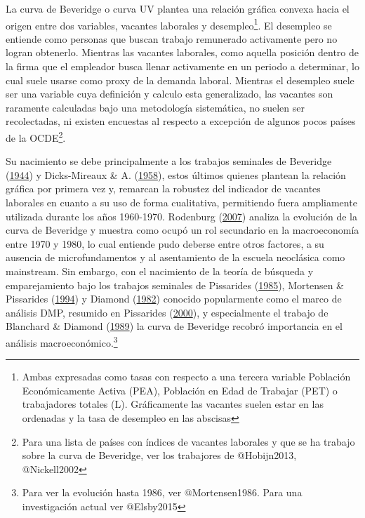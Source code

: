 \documentclass[12pt,twoside]{reedthesis}
\begin{document}
La curva de Beveridge o curva UV plantea una relación gráfica convexa hacia el origen entre dos variables, vacantes laborales y desempleo\footnote{Ambas expresadas como tasas con respecto a una tercera variable Población Económicamente Activa (PEA), Población en Edad de Trabajar (PET) o trabajadores totales (L). Gráficamente las vacantes suelen estar en las ordenadas y la tasa de desempleo en las abscisas}. El desempleo se entiende como personas que buscan trabajo remunerado activamente pero no logran obtenerlo. Mientras las vacantes laborales, como aquella posición dentro de la firma que el empleador busca llenar activamente en un periodo a determinar, lo cual suele usarse como proxy de la demanda laboral.
Mientras el desempleo suele ser una variable cuya definición y calculo esta generalizado, las vacantes son raramente calculadas bajo una metodología sistemática, no suelen ser recolectadas, ni existen encuestas al respecto a excepción de algunos pocos países de la OCDE\footnote{Para una lista de países con índices de vacantes laborales y que se ha trabajo sobre la curva de Beveridge, ver los trabajores de @Hobijn2013, @Nickell2002}.

Su nacimiento se debe principalmente a los trabajos seminales de Beveridge (\protect\hyperlink{ref-Beveridge}{1944}) y Dicks-Mireaux \& A. (\protect\hyperlink{ref-Dicks-Mireaux1958}{1958}), estos últimos quienes plantean la relación gráfica por primera vez y, remarcan la robustez del indicador de vacantes laborales en cuanto a su uso de forma cualitativa, permitiendo fuera ampliamente utilizada durante los años 1960-1970. Rodenburg (\protect\hyperlink{ref-Rodenburg2007}{2007}) analiza la evolución de la curva de Beveridge y muestra como ocupó un rol secundario en la macroeconomía entre 1970 y 1980, lo cual entiende pudo deberse entre otros factores, a su ausencia de microfundamentos y al asentamiento de la escuela neoclásica como mainstream. Sin embargo, con el nacimiento de la teoría de búsqueda y emparejamiento bajo los trabajos seminales de Pissarides (\protect\hyperlink{ref-Pissarides1985}{1985}), Mortensen \& Pissarides (\protect\hyperlink{ref-Mortensen1994}{1994}) y Diamond (\protect\hyperlink{ref-Diamond1982}{1982}) conocido popularmente como el marco de análisis DMP, resumido en Pissarides (\protect\hyperlink{ref-Pissarides2000}{2000}), y especialmente el trabajo de Blanchard \& Diamond (\protect\hyperlink{ref-Blanchard1989}{1989}) la curva de Beveridge recobró importancia en el análisis macroeconómico.\footnote{Para ver la evolución hasta 1986, ver @Mortensen1986. Para una investigación actual ver @Elsby2015}
\end{document}
